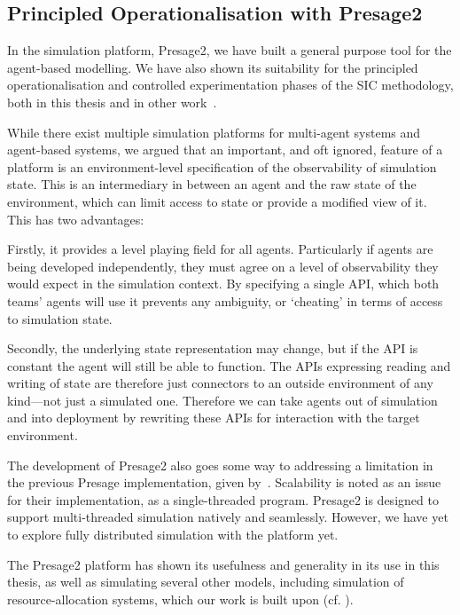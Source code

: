\subsection{Principled Operationalisation with Presage2}

In the simulation platform, Presage2, we have built a general purpose tool for
the agent-based modelling. We have also shown its suitability for the
principled operationalisation and controlled experimentation phases of the
\ac{SIC} methodology, both in this thesis and in other
work~\citep{Macbeth2014}.

While there exist multiple simulation platforms for multi-agent systems and
agent-based systems, we argued that an important, and oft ignored, feature of
a platform is an environment-level specification of the observability of
simulation state. This is an intermediary in between an agent and the raw
state of the environment, which can limit access to state or provide a modified view of it.
This has two advantages:

Firstly, it provides a level playing field for all agents. Particularly if
agents are being developed independently, they must agree on a level of
observability they would expect in the simulation context. By specifying a
single \ac{API}, which both teams' agents will use it prevents any ambiguity,
or `cheating' in terms of access to simulation state.

Secondly, the underlying state representation may change, but if the \ac{API}
is constant the agent will still be able to function. The \acp{API} expressing
reading and writing of state are therefore just connectors to an outside
environment of any kind---not just a simulated one. Therefore we can take
agents out of simulation and into deployment by rewriting these \acp{API} for
interaction with the target environment.

The development of Presage2 also goes some way to addressing a limitation in
the previous Presage implementation, given by~\citet{Neville2011}. Scalability is noted as an issue for their implementation, as a single-threaded
program. Presage2 is designed to support multi-threaded simulation natively
and seamlessly. However, we have yet to explore fully distributed simulation
with the platform yet.

The Presage2 platform has shown its usefulness and generality in its use in
this thesis, as well as simulating several other models, including simulation
of resource-allocation systems, which our work is built upon (cf.
\citet{Schaumeier2013,Pitt2014}).

